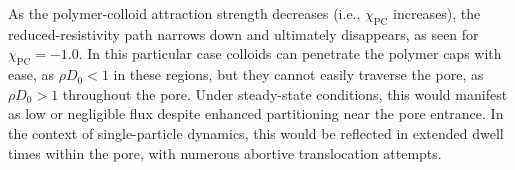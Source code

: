 \documentclass[12pt, a4paper]{article}
\begin{document}






As the polymer-colloid attraction strength decreases (i.e., $\chi_{\text{PC}}$ increases), the reduced-resistivity path narrows down and ultimately disappears, as seen for $\chi_{\text{PC}} = -1.0$.
In this particular case colloids can penetrate the polymer caps with ease, as $\rho D_0 < 1 $ in these regions, but they cannot easily traverse the pore, as $\rho D_0 > 1 $ throughout the pore. 
Under steady-state conditions, this would manifest as low or negligible flux despite enhanced partitioning near the pore entrance. In the context of single-particle dynamics, this would be reflected in extended dwell times within the pore, with numerous abortive translocation attempts.
\end{document}

